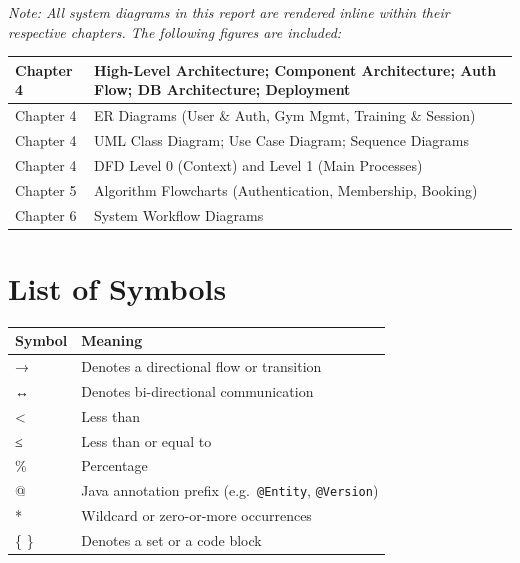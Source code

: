 \documentclass[
  12pt,
  a4paperpaper,
]{report}
\newcounter{none} %
\begin{document}
\clearpage

\listoffigures

\noindent\textit{Note: All system diagrams in this report are rendered inline within their respective chapters. The following figures are included:}

\medskip

\noindent

\noindent\begin{tabularx}{\textwidth}{|p{3cm}|X|}
\hline
Chapter 4 & High-Level Architecture; Component Architecture; Auth Flow; DB Architecture; Deployment \\[3pt]
\hline
Chapter 4 & ER Diagrams (User \& Auth, Gym Mgmt, Training \& Session) \\[3pt]
\hline
Chapter 4 & UML Class Diagram; Use Case Diagram; Sequence Diagrams \\[3pt]
\hline
Chapter 4 & DFD Level 0 (Context) and Level 1 (Main Processes) \\[3pt]
\hline
Chapter 5 & Algorithm Flowcharts (Authentication, Membership, Booking) \\[3pt]
\hline
Chapter 6 & System Workflow Diagrams \\
\hline
\end{tabularx}

\clearpage

\chapter*{List of Symbols}\label{list-of-symbols}


{\def\LTcaptype{none} %
\begin{longtable}[]{@{}ll@{}}
\hline
Symbol & Meaning \\
\hline
\endhead
\hline
\endlastfoot
→ & Denotes a directional flow or transition \\
↔ & Denotes bi-directional communication \\
\textless{} & Less than \\
≤ & Less than or equal to \\
\% & Percentage \\
@ & Java annotation prefix (e.g.~\texttt{@Entity}, \texttt{@Version}) \\
* & Wildcard or zero-or-more occurrences \\
\{ \} & Denotes a set or a code block \\
\end{longtable}
}
\end{document}
